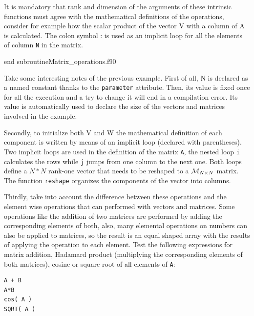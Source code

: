 \begin{itemize}
    It is mandatory that rank and dimension of the arguments of these intrinsic functions must agree with the mathematical definitions of
    the operations, consider for example how the scalar product of the vector V with a column of A is calculated. The colon symbol : is used
    as an implicit loop for all the elements of column \texttt{N} in the matrix. 
    
\end{itemize}






      {end subroutine}{Matrix_operations.f90}








Take some interesting notes of the previous example. First of all, N is declared as a named constant thanks to the 
\texttt{parameter} attribute. Then, its value is fixed once for all the execution and a try to change it will 
end in a compilation error. Its value is automatically used to declare the 
size of the vectors and matrices involved in the example. 

Secondly, to initialize both V and W the mathematical definition of each component is written by means of an implicit loop (declared with parentheses). 
Two implicit loops are used in the definition of the matrix \texttt{A}, the nested loop \texttt{i} 
calculates the rows while \texttt{j} jumps from one column to the next one. Both loops define 
a $ N * N $ rank-one vector that needs to be reshaped to a ${ \cal{M}}_{N \times N} $ matrix. The function \texttt{reshape} organizes
the components of the vector into columns. 
 
Thirdly, take into account the difference between these operations and the element wise operations that can performed with 
vectors and matrices. Some operations like the addition of two matrices are performed by adding the corresponding elements of both, also, 
many elemental operations on numbers can also be applied to matrices, so the result is an equal shaped array 
with the results of applying the operation to each element. Test the following expressions for matrix addition, Hadamard product (multiplying the corresponding elements of both matrices), cosine or square root of all elements of \texttt{A}:

\begin{verbatim} 
A + B
A*B
cos( A )
SQRT( A )
\end{verbatim}

